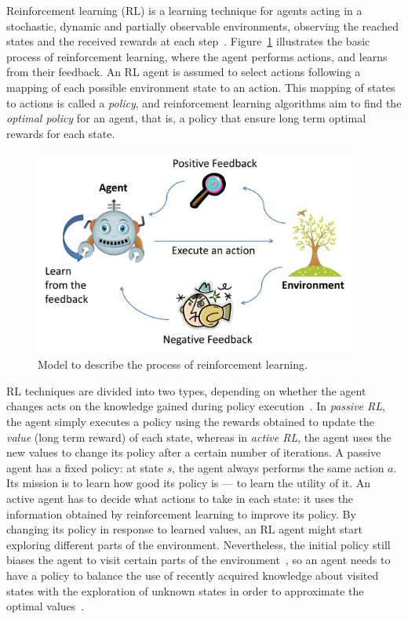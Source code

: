 Reinforcement learning (RL) is a learning technique for agents acting in a stochastic, dynamic and partially observable environments, observing the reached states and the received rewards at each step~\cite{sutton1998reinforcement}. 
Figure~\ref{fig:rl} illustrates the basic process of reinforcement learning, where the agent performs actions, and learns from their feedback. 
An RL agent is assumed to select actions following a mapping of each possible environment state to an action. 
This mapping of states to actions is called a \emph{policy}, and reinforcement learning algorithms aim to find the \emph{optimal policy} for an agent, that is, a policy that ensure long term optimal rewards for each state. 

\begin{figure}[ht]
\centering
\includegraphics[width=400px]{images/rl}
\caption{Model to describe the process of reinforcement learning.}
\label{fig:rl}
\end{figure}

RL techniques are divided into two types, depending on whether the agent changes acts on the knowledge gained during policy execution~\cite{russell1995artificial}. 
In \emph{passive RL}, the agent simply executes a policy using the rewards obtained to update the \emph{value} (long term reward) of each state, whereas in \emph{active RL}, the agent uses the new values to change its policy after a certain number of iterations.
A passive agent has a fixed policy: at state $s$, the agent always performs the same action $a$.
Its mission is to learn how good its policy is --- to learn the utility of it.
An active agent has to decide what actions to take in each state:
it uses the information obtained by reinforcement learning to improve its policy. 
By changing its policy in response to learned values, an RL agent might start exploring different parts of the environment. 
Nevertheless, the initial policy still biases the agent to visit certain parts of the environment~\cite{russell1995artificial}, so an agent needs to have a policy to balance the use of recently acquired knowledge about visited states with the exploration of unknown states in order to approximate the optimal values~\cite{ghory2004boardgames}. 



